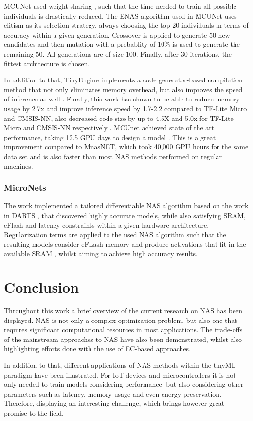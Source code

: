 \documentclass[10pt,        %
               a4paper,     %
               journal,     %
               ]{IEEEtran}
\begin{document}
MCUNet used weight sharing \cite{lin2020mcunet}, such that the time needed to train all possible individuals is drastically
reduced. The ENAS algorithm used in MCUNet uses elitism as its selection strategy, always choosing the top-20 individuals in
terms of accuracy within a given generation. Crossover is applied to generate 50 new candidates and then mutation with a
probablity of 10\% is used to generate the remaining 50. All generations are of size 100. Finally, after 30 iterations,
the fittest architecture is chosen.

In addition to that, TinyEngine implements a code generator-based compilation method that not only eliminates memory overhead, but also improves
the speed of inference as well \cite{lin2020mcunet}.
Finally, this work has shown to be able to
reduce memory usage by 2.7x and improve inference speed by 1.7-2.2
compared to TF-Lite Micro and CMSIS-NN, also decreased code size by up to 4.5X and 5.0x for TF-Lite Micro and CMSIS-NN
respectively \cite{lin2020mcunet}. MCUnet achieved state of the art performance, taking 12.5 GPU days to design a model
\cite{lin2020mcunet}. This is a great improvement compared to MnasNET, which took 40,000 GPU hours for the same
data set \cite{tan2019mnasnet} and is also faster than most NAS methods performed on regular machines.

\subsubsection{\textbf{MicroNets}}
The work \cite{banbury2021micronets} implemented a tailored differentiable NAS algorithm based on the work in DARTS
\cite{liu2018darts}, that discovered highly accurate models, while also satisfying SRAM, eFlash and latency constraints
within a given hardware architecture. Regularization terms are applied to the used NAS algorithm such that the resulting
models consider eFLash memory and produce activations that fit in the available SRAM \cite{banbury2021micronets}, whilst
aiming to achieve high accuracy results.

\section{Conclusion}
Throughout this work a brief overview of the current research on NAS has been displayed. NAS is not only
a complex optimization problem, but also one that requires significant computational resources in most applications. The
trade-offs of the mainstream approaches to NAS have also been demonstrated, whilst also highlighting efforts done with the
use of EC-based approaches.

In addition to that, different applications of NAS methods within the tinyML paradigm have been illustrated.
For IoT devices and microcontrollers it is not only needed to train models considering performance,
but also considering other parameters such as latency, memory usage and even energy preservation. Therefore, displaying
an interesting challenge, which brings however great promise to the field.




%
\end{document}
